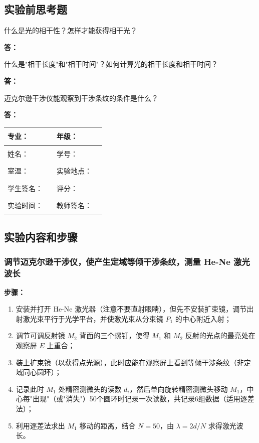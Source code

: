 \documentclass[dvipsnames, svgnames,a4paper,11pt]{article}
\newcommand{\answerblank}[1][3.8cm]{%
  \par\nopagebreak[4]\noindent\textbf{答：}\par\nopagebreak[4]\vspace*{#1}}
\begin{document}
\subsection{实验前思考题}

\begin{question}
	什么是光的相干性？怎样才能获得相干光？
\end{question}
\answerblank[3.8cm]

\begin{question}
	什么是"相干长度"和"相干时间"？如何计算光的相干长度和相干时间？
\end{question}
\answerblank[3.8cm]

\begin{question}
	迈克尔逊干涉仪能观察到干涉条纹的条件是什么？
\end{question}
\answerblank[3.8cm]

\clearpage
\begin{table}
	\renewcommand\arraystretch{1.7}
	\centering
	\begin{tabularx}{\textwidth}{|X|X|X|X|}
	\hline
	专业：& \rule{2.5cm}{0.4pt} & 年级：& \rule{2.5cm}{0.4pt} \\
	\hline
	姓名： & \rule{2.5cm}{0.4pt} & 学号：& \rule{3cm}{0.4pt}\\
	\hline
	室温：& \rule{2.5cm}{0.4pt} & 实验地点：& \rule{2.5cm}{0.4pt} \\
	\hline
	学生签名：& \rule{2.5cm}{0.4pt} & 评分：& \\
	\hline
	实验时间：& \rule{3cm}{0.4pt} & 教师签名：& \rule{3cm}{0.4pt} \\
	\hline
	\end{tabularx}
\end{table}


\subsection{实验内容和步骤}

\subsubsection{调节迈克尔逊干涉仪，使产生定域等倾干涉条纹，测量 He-Ne 激光波长}

\textbf{步骤：}
\begin{enumerate}
    \item 安装并打开 He-Ne 激光器（注意不要直射眼睛），但先不安装扩束镜，调节出射激光束平行于光学平台，并使激光束从分束镜 $P_1$ 的中心附近入射；
    \item 调节可调反射镜 $M_2$ 背面的三个螺钉，使得 $M_1$ 和 $M_2$ 反射的光点的最亮处在观察屏 $E$ 上重合；
    \item 装上扩束镜（以获得点光源），此时应能在观察屏上看到等倾干涉条纹（非定域同心圆环）；
    \item 记录此时 $M_1$ 处精密测微头的读数 $d_i$，然后单向旋转精密测微头移动 $M_1$，中心每"出现"（或"消失"）50个圆环时记录一次读数，共记录6组数据（适用逐差法）；
    \item 利用逐差法求出 $M_1$ 移动的距离，结合 $N=50$，由 $\lambda=2d/N$ 求得激光波长。
\end{enumerate}
\end{document}

